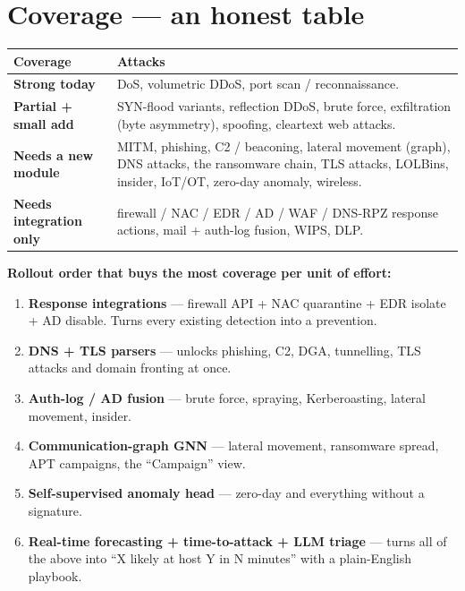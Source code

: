 \documentclass[11pt,a4paper]{article}
\begin{document}
\section{Coverage --- an honest table}

\begin{table}[H]\centering\small
\begin{tabular}{@{}p{4.2cm}p{10.5cm}@{}}
\toprule
\textbf{Coverage} & \textbf{Attacks} \\ \midrule
\textbf{Strong today} & DoS, volumetric DDoS, port scan / reconnaissance. \\
\textbf{Partial + small add} & SYN-flood variants, reflection DDoS, brute force,
  exfiltration (byte asymmetry), spoofing, cleartext web attacks. \\
\textbf{Needs a new module} & MITM, phishing, C2 / beaconing, lateral movement
  (graph), DNS attacks, the ransomware chain, TLS attacks, LOLBins, insider,
  IoT/OT, zero-day anomaly, wireless. \\
\textbf{Needs integration only} & firewall / NAC / EDR / AD / WAF / DNS-RPZ
  response actions, mail + auth-log fusion, WIPS, DLP. \\
\bottomrule
\end{tabular}
\end{table}

\textbf{Rollout order that buys the most coverage per unit of effort:}
\begin{enumerate}[itemsep=1pt]
\item \textbf{Response integrations} --- firewall API + NAC quarantine + EDR
  isolate + AD disable. Turns every existing detection into a prevention.
\item \textbf{DNS + TLS parsers} --- unlocks phishing, C2, DGA, tunnelling, TLS
  attacks and domain fronting at once.
\item \textbf{Auth-log / AD fusion} --- brute force, spraying, Kerberoasting,
  lateral movement, insider.
\item \textbf{Communication-graph GNN} --- lateral movement, ransomware spread,
  APT campaigns, the ``Campaign'' view.
\item \textbf{Self-supervised anomaly head} --- zero-day and everything without a
  signature.
\item \textbf{Real-time forecasting + time-to-attack + LLM triage} --- turns all
  of the above into ``X likely at host Y in N minutes'' with a plain-English
  playbook.
\end{enumerate}
\end{document}
